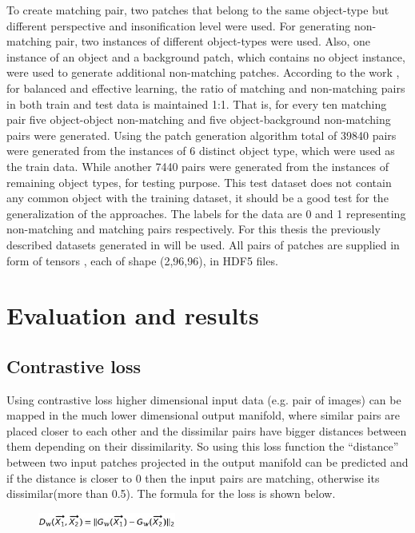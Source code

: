 To create matching pair, two patches that belong to the same object-type but different perspective and insonification level were used. For generating non-matching pair, two instances of different 
object-types were used. Also, one instance of an object and a background patch, which contains no object instance, were used to generate additional non-matching patches. According to the work \cite{stateoftheart}, 
for balanced and effective learning, the ratio of matching and non-matching pairs in both train and test data is maintained 1:1. That is, for every ten matching pair five object-object non-matching 
and five object-background non-matching pairs were generated. Using the patch generation algorithm total of 39840 pairs were generated from the instances of 6 distinct object type, which were used as the train data.
While another 7440 pairs were generated from the instances of remaining object types, for testing purpose. This test dataset does not contain any common object with the training dataset,
it should be a good test for the generalization of the approaches. The labels for the data are 0 and 1 representing non-matching and matching pairs respectively. 
For this thesis the previously described datasets generated in \cite{stateoftheart} will be used.
All pairs of patches are supplied in form of tensors \cite{tensors}, each of shape (2,96,96), in HDF5 files.

\chapter{Evaluation and results}
\section{Contrastive loss}
Using contrastive loss higher dimensional input data (e.g. pair of images) can be mapped in the much lower dimensional output manifold, where similar pairs are placed closer to each other and 
the dissimilar pairs have bigger distances between them depending on their dissimilarity.  So using this loss function the “distance” between two input patches projected in the output manifold can be 
predicted and if the distance is closer to 0 then the input pairs are matching, otherwise its dissimilar(more than 0.5). The formula for the loss is shown below. 
\begin{figure}[ht]
\centering
\includegraphics[height= 0.45cm]{images/contrastive/contrastive_loss_formula1.jpg}%
\label{fig:contrastive_loss_formula1}
\end{figure}

